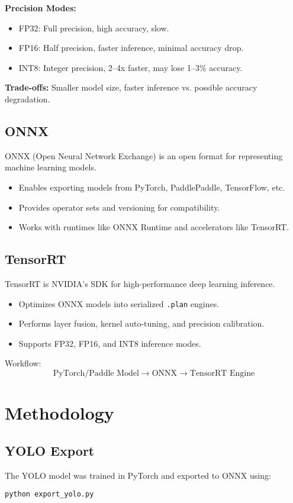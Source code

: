 \documentclass[12pt,a4paper]{article}
\begin{document}
\textbf{Precision Modes:}
\begin{itemize}
    \item FP32: Full precision, high accuracy, slow.
    \item FP16: Half precision, faster inference, minimal accuracy drop.
    \item INT8: Integer precision, 2--4x faster, may lose 1--3\% accuracy.
\end{itemize}

\textbf{Trade-offs:} Smaller model size, faster inference vs. possible accuracy degradation.

\subsection{ONNX}
ONNX (Open Neural Network Exchange) is an open format for representing machine learning models.  
\begin{itemize}
    \item Enables exporting models from PyTorch, PaddlePaddle, TensorFlow, etc.  
    \item Provides operator sets and versioning for compatibility.  
    \item Works with runtimes like ONNX Runtime and accelerators like TensorRT.  
\end{itemize}

\subsection{TensorRT}
TensorRT is NVIDIA’s SDK for high-performance deep learning inference.  
\begin{itemize}
    \item Optimizes ONNX models into serialized \texttt{.plan} engines.  
    \item Performs layer fusion, kernel auto-tuning, and precision calibration.  
    \item Supports FP32, FP16, and INT8 inference modes.  
\end{itemize}

Workflow:  
\[
\text{PyTorch/Paddle Model} \rightarrow \text{ONNX} \rightarrow \text{TensorRT Engine}
\]

\section{Methodology}
\subsection{YOLO Export}
The YOLO model was trained in PyTorch and exported to ONNX using:
\begin{verbatim}
python export_yolo.py
\end{verbatim}
\end{document}
